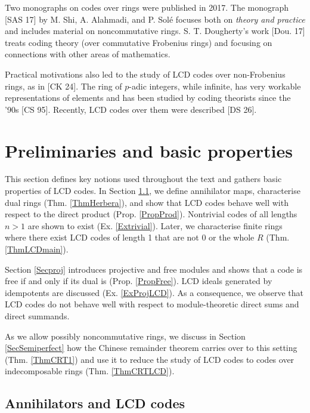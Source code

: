 \documentclass{article}
\theoremstyle{plain}
\theoremstyle{plain}
\theoremstyle{remark}
\theoremstyle{plain}
\begin{document}
Two monographs on codes over rings were published in 2017.  The monograph  [SAS 17] by M. Shi, A. Alahmadi, and P. Solé focuses both on \textit{theory and practice} and includes material on noncommutative rings. S. T. Dougherty's work [Dou. 17] treats coding theory (over commutative Frobenius rings)  and focusing on connections with other areas of mathematics. %



Practical motivations also led to the study of LCD codes over non-Frobenius rings, as in [CK 24]. The ring of $p$-adic integers, while infinite, has very workable representations of elements and has been studied by coding theorists since the '90s [CS 95]. Recently, LCD codes over them were described [DS 26].




\section{Preliminaries and basic properties}\label{SecPrel}

This section defines key notions used throughout the text and gathers basic properties of LCD codes. In Section \ref{SecAnn}, we define annihilator maps, characterise dual rings (Thm. \ref{ThmHerbera}), and show that LCD codes behave well with respect to the direct product (Prop. \ref{PropProd}). Nontrivial codes of all lengths $n>1$ are shown to exist (Ex. \ref{Extrivial}). Later, we characterise finite rings where there exist LCD codes of length 1 that are not $0$ or the whole $R$ (Thm. \ref{ThmLCDmain}).

Section \ref{Secproj} introduces projective and free modules and shows that a code is free if and only if its dual is (Prop. \ref{PropFree}). LCD ideals generated by idempotents are discussed (Ex. \ref{ExProjLCD}). As a consequence, we observe that LCD codes do not behave well with respect to module-theoretic direct sums and direct summands. 

As we allow possibly noncommutative rings, we discuss in Section \ref{SecSemiperfect} how the Chinese remainder theorem carries over to this setting (Thm. \ref{ThmCRT1}) and use it to reduce the study of LCD codes to codes over indecomposable rings (Thm. \ref{ThmCRTLCD}).


\subsection{Annihilators and LCD codes}\label{SecAnn}
\end{document}

